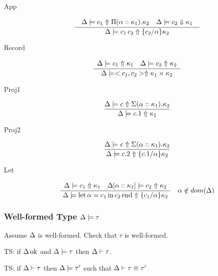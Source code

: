 \documentclass[12pt,twoside,fleqn]{amsart}
\theoremstyle{plain}
\theoremstyle{plain}
\theoremstyle{definition}
\begin{document}
\begin{description}
\item [App]
\[
\frac{\begin{array}{cc}
\begin{array}{ll}
\Delta  \models c_{1} \Uparrow \Pi (\alpha ::\kappa _{1}).\kappa _{2} & \Delta  \models c_{2} \Downarrow \kappa _{1}
\end{array}
\end{array} }{\Delta  \models c_{1}\, c_{2} \Uparrow \{c_{2} /\alpha  \}\kappa _{2} }\]

\item [Record]
\[
\frac{\begin{array}{ll}
\Delta  \models c_{1} \Uparrow \kappa _{1} & \Delta  \models c_{2} \Uparrow \kappa _{2}
\end{array} }{\Delta  \models <c_{1},c_{2}> \Uparrow \kappa _{1}\times \kappa _{2} }\]

\item [Proj1]
\[
\frac{\Delta  \models c \Uparrow \Sigma (\alpha ::\kappa _{1}).\kappa _{2} }{\Delta  \models c.1 \Uparrow \kappa _{1} }\]

\item [Proj2]
\[
\frac{\Delta  \models c \Uparrow \Sigma (\alpha ::\kappa _{1}).\kappa _{2} }{\Delta  \models c.2 \Uparrow \{c.1 /\alpha  \}\kappa _{2} }\]

\item [Let]
\[
\frac{\begin{array}{ll}
\Delta  \models c_{1} \Uparrow \kappa _{1} & \Delta [\alpha ::\kappa _{1}] \models c_{2} \Uparrow \kappa _{2}
\end{array} }{\Delta  \models \mathrm{let}\, \alpha  =c_{1} \, \mathrm{in}\, c_{2} \, \mathrm{end} \Uparrow \{c_{1} /\alpha  \}\kappa _{2} }\quad \alpha \notin dom(\Delta )\]

\end{description}

\subsubsection{Well-formed Type \protect\( \Delta  \models \tau  \protect \)}

Assume \( \Delta  \) is well-formed. Check that \( \tau  \) is well-formed.

TS: if \( \Delta  \, \mathrm{ok} \) and \( \Delta  \models \tau   \) then \( \Delta  \vdash \tau   \).

TS: if \( \Delta  \vdash \tau   \) then \( \Delta  \models \tau '  \) such that \( \Delta  \vdash \tau  \equiv \tau ' \)
\end{document}
